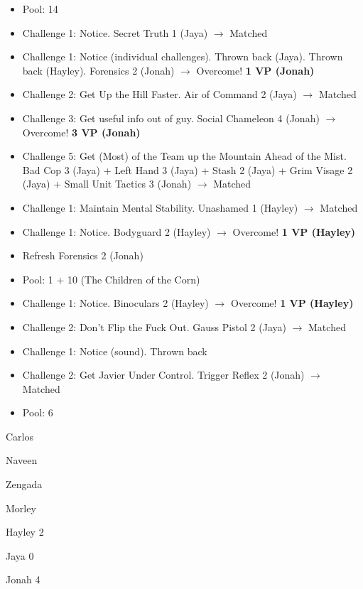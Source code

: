 \begin{itemize}
\item Pool: 14
\item Challenge 1: Notice.  Secret Truth 1 (Jaya) $\rightarrow$ Matched
\item Challenge 1: Notice (individual challenges).  Thrown back (Jaya).  Thrown back (Hayley).  Forensics 2 (Jonah) $\rightarrow$ Overcome! \textbf{1 VP (Jonah)}
\item Challenge 2: Get Up the Hill Faster.  Air of Command 2 (Jaya) $\rightarrow$ Matched 
\item Challenge 3: Get useful info out of guy.  Social Chameleon 4 (Jonah) $\rightarrow$ Overcome! \textbf{3 VP (Jonah)}
\item Challenge 5: Get (Most) of the Team up the Mountain Ahead of the Mist.  Bad Cop 3 (Jaya) + Left Hand 3 (Jaya) + Stash 2 (Jaya) + Grim Visage 2 (Jaya) + Small Unit Tactics 3 (Jonah) $\rightarrow$ Matched
\item Challenge 1: Maintain Mental Stability.  Unashamed 1 (Hayley) $\rightarrow$ Matched
\item Challenge 1: Notice.  Bodyguard 2 (Hayley) $\rightarrow$ Overcome! \textbf{1 VP (Hayley)}
\item Refresh Forensics 2 (Jonah)
\item Pool: 1 + 10 (The Children of the Corn)
\item Challenge 1: Notice.  Binoculars 2 (Hayley) $\rightarrow$ Overcome! \textbf{1 VP (Hayley)}
\item Challenge 2: Don't Flip the Fuck Out.  Gauss Pistol 2 (Jaya) $\rightarrow$ Matched
\item Challenge 1: Notice (sound).  Thrown back
\item Challenge 2: Get Javier Under Control.  Trigger Reflex 2 (Jonah) $\rightarrow$ Matched
\item Pool: 6
\end{itemize}



{\parskip=0pt
Carlos

Naveen

Zengada

Morley
}


{\parskip=0pt
Hayley 2

Jaya 0

Jonah 4
}


